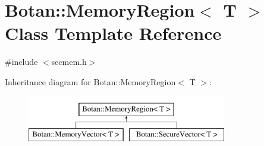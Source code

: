\hypertarget{classBotan_1_1MemoryRegion}{\section{Botan\-:\-:Memory\-Region$<$ T $>$ Class Template Reference}
\label{classBotan_1_1MemoryRegion}
}


{\ttfamily \#include $<$secmem.\-h$>$}

Inheritance diagram for Botan\-:\-:Memory\-Region$<$ T $>$\-:\begin{figure}[H]
\begin{center}
\leavevmode
\includegraphics[height=2.000000cm]{classBotan_1_1MemoryRegion}
\end{center}
\end{figure}
